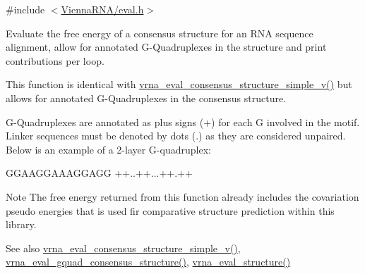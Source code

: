 {\ttfamily \#include $<$\hyperlink{eval_8h}{Vienna\+R\+N\+A/eval.\+h}$>$}



Evaluate the free energy of a consensus structure for an R\+NA sequence alignment, allow for annotated G-\/\+Quadruplexes in the structure and print contributions per loop. 

This function is identical with \hyperlink{group__eval_gad88927c62ab0a8b534e078e44be1b36e}{vrna\+\_\+eval\+\_\+consensus\+\_\+structure\+\_\+simple\+\_\+v()} but allows for annotated G-\/\+Quadruplexes in the consensus structure.

G-\/\+Quadruplexes are annotated as plus signs (\textquotesingle{}+\textquotesingle{}) for each G involved in the motif. Linker sequences must be denoted by dots (\textquotesingle{}.\textquotesingle{}) as they are considered unpaired. Below is an example of a 2-\/layer G-\/quadruplex\+: 
\begin{DoxyCode}
GGAAGGAAAGGAGG
++..++...++.++
\end{DoxyCode}


\begin{DoxyNote}{Note}
The free energy returned from this function already includes the covariation pseudo energies that is used fir comparative structure prediction within this library.
\end{DoxyNote}
\begin{DoxySeeAlso}{See also}
\hyperlink{group__eval_gad88927c62ab0a8b534e078e44be1b36e}{vrna\+\_\+eval\+\_\+consensus\+\_\+structure\+\_\+simple\+\_\+v()}, \hyperlink{group__eval_gaf09a326b3d57a4b30c27bd0e216198ac}{vrna\+\_\+eval\+\_\+gquad\+\_\+consensus\+\_\+structure()}, \hyperlink{group__eval_ga58f199f1438d794a265f3b27fc8ea631}{vrna\+\_\+eval\+\_\+structure()}
\end{DoxySeeAlso}

